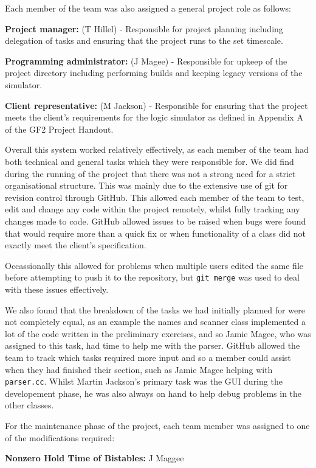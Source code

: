 \documentclass[a4paper,10pt]{article}
\begin{document}
Each member of the team was also assigned a general project role as follows:

\textbf{Project manager:} (T Hillel) - Responsible for project planning including delegation of tasks and ensuring that the project runs to the set timescale.

\textbf{Programming administrator:} (J Magee) - Responsible for upkeep of the project directory including performing builds and keeping legacy versions of the simulator.

\textbf{Client representative:} (M Jackson) - Responsible for ensuring that the project meets the client's requirements for the logic simulator as defined in Appendix A of the GF2 Project Handout.

Overall this system worked relatively effectively, as each member of the team had both technical and general tasks which they were responsible for. We did find during the running of the project that there was not a strong need for a strict organisational structure. This was mainly due to the extensive use of git for revision control through GitHub. This allowed each member of the team to test, edit and change any code within the project remotely, whilst fully tracking any changes made to code. GitHub allowed issues to be raised when bugs were found that would require more than a quick fix or when functionality of a class did not exactly meet the client's specification.

Occassionally this allowed for problems when multiple users edited the same file before attempting to push it to the repository, but \texttt{git merge} was used to deal with these issues effectively.

We also found that the breakdown of the tasks we had initially planned for were not completely equal, as an example the names and scanner class implemented a lot of the code written in the preliminary exercises, and so Jamie Magee, who was assigned to this task, had time to help me with the parser. GitHub allowed the team to track which tasks required more input and so a member could assist when they had finished their section, such as Jamie Magee helping with \texttt{parser.cc}. Whilst Martin Jackson's primary task was the GUI during the developement phase, he was also always on hand to help debug problems in the other classes.

For the maintenance phase of the project, each team member was assigned to one of the modifications required:

\textbf{Nonzero Hold Time of Bistables:} J Maggee
\end{document}
